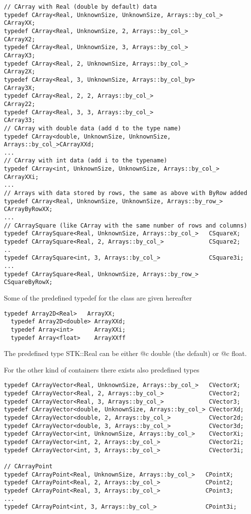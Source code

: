\documentclass[a4paper,10pt]{article}
\begin{document}
\begin{lstlisting}[style=customcpp,caption=CArray family]
// CArray with Real (double by default) data
typedef CArray<Real, UnknownSize, UnknownSize, Arrays::by_col_> CArrayXX;
typedef CArray<Real, UnknownSize, 2, Arrays::by_col_>           CArrayX2;
typedef CArray<Real, UnknownSize, 3, Arrays::by_col_>           CArrayX3;
typedef CArray<Real, 2, UnknownSize, Arrays::by_col_>           CArray2X;
typedef CArray<Real, 3, UnknownSize, Arrays::by_col_by>         CArray3X;
typedef CArray<Real, 2, 2, Arrays::by_col_>                     CArray22;
typedef CArray<Real, 3, 3, Arrays::by_col_>                     CArray33;
// CArray with double data (add d to the type name)
typedef CArray<double, UnknownSize, UnknownSize, Arrays::by_col_>CArrayXXd;
...
// CArray with int data (add i to the typename)
typedef CArray<int, UnknownSize, UnknownSize, Arrays::by_col_>  CArrayXXi;
...
// Arrays with data stored by rows, the same as above with ByRow added
typedef CArray<Real, UnknownSize, UnknownSize, Arrays::by_row_> CArrayByRowXX;
...
// CArraySquare (like CArray with the same number of rows and columns)
typedef CArraySquare<Real, UnknownSize, Arrays::by_col_>   CSquareX;
typedef CArraySquare<Real, 2, Arrays::by_col_>             CSquare2;
..
typedef CArraySquare<int, 3, Arrays::by_col_>              CSquare3i;
...
typedef CArraySquare<Real, UnknownSize, Arrays::by_row_>   CSquareByRowX;
\end{lstlisting}

Some of the predefined typedef for the  class are given hereafter
\begin{lstlisting}[style=customcpp,caption=Array2D family]
  typedef Array2D<Real>   ArrayXX;
  typedef Array2D<double> ArrayXXd;
  typedef Array<int>      ArrayXXi;
  typedef Array<float>    ArrayXXff
\end{lstlisting}

The predefined type STK::Real can be either @c double (the default) or @c float.

For the other kind of containers there exists also predefined types

\begin{lstlisting}[style=customcpp,caption=CArrayVector and CArrayPoint family]
typedef CArrayVector<Real, UnknownSize, Arrays::by_col_>   CVectorX;
typedef CArrayVector<Real, 2, Arrays::by_col_>             CVector2;
typedef CArrayVector<Real, 3, Arrays::by_col_>             CVector3;
typedef CArrayVector<double, UnknownSize, Arrays::by_col_> CVectorXd;
typedef CArrayVector<double, 2, Arrays::by_col_>           CVector2d;
typedef CArrayVector<double, 3, Arrays::by_col_>           CVector3d;
typedef CArrayVector<int, UnknownSize, Arrays::by_col_>    CVectorXi;
typedef CArrayVector<int, 2, Arrays::by_col_>              CVector2i;
typedef CArrayVector<int, 3, Arrays::by_col_>              CVector3i;

// CArrayPoint
typedef CArrayPoint<Real, UnknownSize, Arrays::by_col_>   CPointX;
typedef CArrayPoint<Real, 2, Arrays::by_col_>             CPoint2;
typedef CArrayPoint<Real, 3, Arrays::by_col_>             CPoint3;
...
typedef CArrayPoint<int, 3, Arrays::by_col_>              CPoint3i;
\end{lstlisting}
\end{document}
